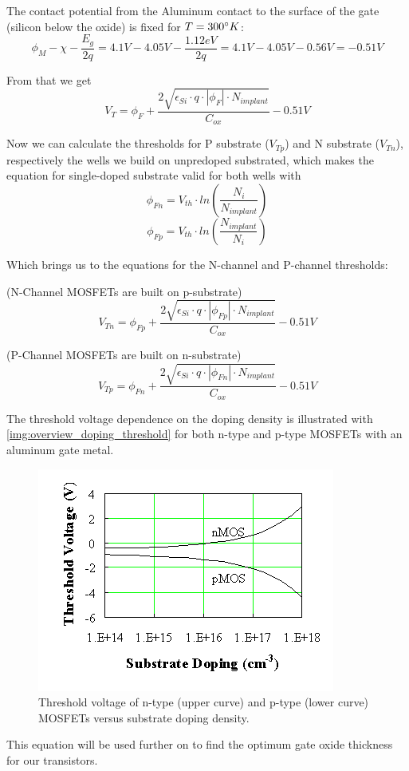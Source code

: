 The contact potential from the Aluminum contact to the surface of the gate (silicon below the oxide) is fixed for $T=300\degree K$:
\begin{equation}
\phi_{M} -  \chi - \frac{E_g}{2 q} = 4.1V - 4.05V - \frac{1.12eV}{2 q} = 4.1V - 4.05V - 0.56V = -0.51V
\end{equation}

From that we get
\begin{equation}
V_T = \phi_F + \frac{2 \sqrt{\epsilon_{Si}\cdot q \cdot \left| \phi_F \right| \cdot N_{implant} }}{C_{ox}} - 0.51V
\end{equation}

Now we can calculate the thresholds for P substrate ($V_{Tp}$) and N substrate  ($V_{Tn}$), respectively the wells we build on unpredoped substrated, which makes the equation for single-doped substrate valid for both wells with
\begin{equation}
\phi_{Fn}
=
V_{th} \cdot ln\left(\frac{N_i}{N_{implant}}\right)
\end{equation}
\begin{equation}
\phi_{Fp}
=
V_{th} \cdot ln\left(\frac{N_{implant}}{N_i}\right)
\end{equation}

Which brings us to the equations for the N-channel and P-channel thresholds:

(N-Channel MOSFETs are built on p-substrate)
\begin{equation}
V_{Tn} = \phi_{Fp} + \frac{2 \sqrt{\epsilon_{Si}\cdot q \cdot \left| \phi_{Fp} \right| \cdot N_{implant} }}{C_{ox}} - 0.51V
\end{equation}

(P-Channel MOSFETs are built on n-substrate)
\begin{equation}
V_{Tp} = \phi_{Fn} + \frac{2 \sqrt{\epsilon_{Si}\cdot q \cdot \left| \phi_{Fn} \right| \cdot N_{implant} }}{C_{ox}} - 0.51V
\end{equation}

The threshold voltage dependence on the doping density is illustrated with \autoref{img:overview_doping_threshold} for both n-type and p-type MOSFETs with an aluminum gate metal.
\begin{figure}[H]
	\centering
	\includegraphics[scale=0.5]{doping_thresholds_overview.png}
	\caption{Threshold voltage of n-type (upper curve) and p-type (lower curve) MOSFETs versus substrate doping density.}
	\label{img:overview_doping_threshold}
\end{figure}

This equation will be used further on to find the optimum gate oxide thickness for our transistors.


